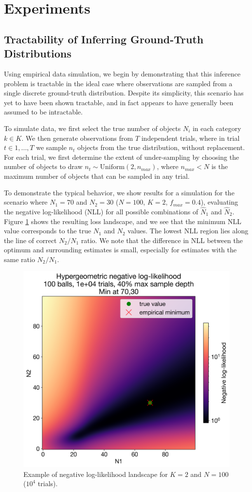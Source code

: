 \documentclass{article}
\theoremstyle{plain}
\theoremstyle{definition}
\theoremstyle{remark}
\begin{document}
\section{Experiments}
\subsection{Tractability of Inferring Ground-Truth Distributions}
\label{sec:single_dist}
Using empirical data simulation, we begin by demonstrating that this inference problem is tractable in the ideal case where observations are sampled from a single discrete ground-truth distribution. Despite its simplicity, this scenario has yet to have been shown tractable, and in fact appears to have generally been assumed to be intractable.

To simulate data, we first select the true number of objects $N_i$ in each category $k \in K$. We then generate observations from $T$ independent trials, where in trial $t \in 1,\ldots,T$ we sample $n_t$ objects from the true distribution, without replacement. For each trial, we first determine the extent of under-sampling by choosing the number of objects to draw $n_t \sim \text{Uniform}(2,n_{max})$, where $n_{max} < N$ is the maximum number of objects that can be sampled in any trial.

To demonstrate the typical behavior, we show results for a simulation for the scenario where $N_1=70$ and $N_2=30$ ($N=100$, $K=2$, $f_{max}=0.4$), evaluating the negative log-likelihood (NLL) for all possible combinations of $\hat{N}_1$ and $\hat{N}_2$. Figure \ref{fig:landscape} shows the resulting loss landscape, and we see that the minimum NLL value corresponds to the true $N_1$ and $N_2$ values. The lowest NLL region lies along the line of correct $N_2/N_1$ ratio. We note that the difference in NLL between the optimum and surrounding estimates is small, especially for estimates with the same ratio $N_2/N_1$.

\begin{figure}[h!]
    \centering
    \includegraphics[width=0.8\columnwidth]{nll_landscape.png}
    \caption{Example of negative log-likelihood landscape for $K=2$ and $N=100$ ($10^4$ trials).}
    \label{fig:landscape}
\end{figure}
\end{document}
